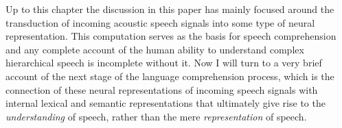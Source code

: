 \documentclass[titlepage]{article}
\begin{document}
  Up to this chapter the discussion in this paper has mainly focused around the transduction of incoming
  acoustic speech signals into some type of neural representation. This computation serves as the basis
  for speech comprehension and any complete account of the human ability to understand complex hierarchical
  speech is incomplete without it. Now I will turn to a very brief account of the next stage of the
  language comprehension process, which is the connection of these neural representations of incoming
  speech signals with internal lexical and semantic representations that ultimately give rise to the
  \textit{understanding} of speech, rather than the mere \textit{representation} of speech.

\newpage
\printbibliography
\end{document}
